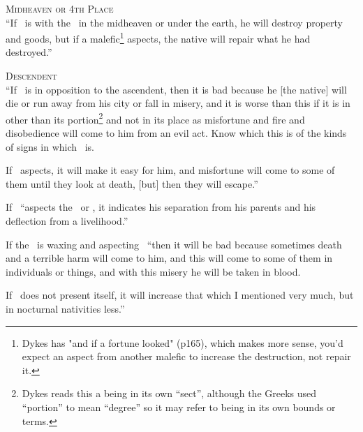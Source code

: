\noindent\textsc{Midheaven or 4th Place} \hfill \\
\indent ``If \Mars\, is with the \Moon\, in the midheaven or under the earth, he will destroy property and goods, but if a malefic\footnote{Dykes has "and if a fortune looked" (p165), which makes more sense, you'd expect an aspect from another malefic to increase the destruction, not repair it.} aspects, the native will repair what he had destroyed.''

\noindent\textsc{Descendent} \hfill \\
\indent ``If \Mars\, is in opposition to the ascendent, then it is bad because he [the native] will die or run away from his city or fall in misery, and it is worse than this if it is in other than its portion\footnote{Dykes reads this a being in its own ``sect'', although the Greeks used ``portion'' to mean ``degree'' so it may refer to being in its own bounds or terms.} and not in its place as misfortune and fire and disobedience will come to him from an evil act. Know which this is of the kinds of signs in which \Mars\, is.

If \Jupiter\, aspects, it will make it easy for him, and misfortune will come to some of them until they look at death, [but] then they will escape.''

If \Mars\, ``aspects the \Sun\, or \Moon, it indicates his separation from his parents and his deflection from a livelihood.'' 

If the \Moon\, is waxing and aspecting \Mars\, ``then it will be bad because sometimes death and a terrible harm will come to him, and this will come to some of them in individuals or things, and with this misery he will be taken in blood.

If \Jupiter\, does not present itself, it will increase that which I mentioned very much, but in nocturnal nativities less.''



